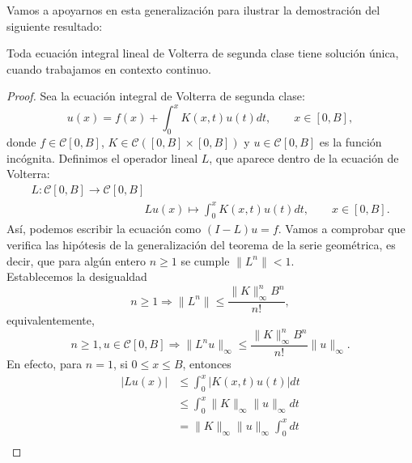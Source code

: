Vamos a apoyarnos en esta generalización para ilustrar la demostración del siguiente resultado:
\begin{corolario}\label{coroooolario}
	Toda ecuación integral lineal de Volterra de segunda clase tiene solución única, cuando trabajamos en contexto continuo.
\end{corolario}
\begin{proof}
	Sea la ecuación integral de Volterra de segunda clase:
	\begin{equation}
		u(x) = f(x) + \int_0^x K(x,t)u(t)dt, \qquad x \in [0,B],
	\end{equation}
	donde $f \in \mathcal{C}[0,B]$, $K \in \mathcal{C}([0,B]\times [0,B])$ y $u \in \mathcal{C}[0,B]$ es la función incógnita.
	Definimos el operador lineal $L$, que aparece dentro de la ecuación de Volterra:
	\begin{equation}\label{ref_operador}
		\begin{array}{c}
		L: \mathcal{C}[0,B] \rightarrow \mathcal{C}[0,B] \\
		\qquad \qquad \qquad \qquad \qquad Lu(x) \mapsto \displaystyle \int_{0}^{x} K(x,t)u(t)dt, \qquad x \in [0,B].
		\end{array}
	\end{equation}
	Así, podemos escribir la ecuación como $(I-L)u = f$.
	Vamos a comprobar que verifica las hipótesis de la generalización del teorema de la serie geométrica, es decir, que para algún entero $n \geqslant 1$ se cumple $\lVert L^n \rVert < 1$.\\
	Establecemos la desigualdad
	\begin{equation}
		n \geqslant 1 \Rightarrow \lVert L^n \rVert \leqslant \dfrac{\lVert K \rVert_\infty^nB^n}{n!},
	\end{equation}
	equivalentemente,
	\begin{equation}\label{eq:ref}
		n \geqslant 1, u \in \mathcal{C}[0,B] \Rightarrow \lVert L^nu \rVert_\infty \leqslant \dfrac{\lVert K \rVert_\infty^nB^n}{n!}\lVert u \rVert_\infty.
	\end{equation}
	En efecto, para $n = 1$, si $0 \leqslant x \leqslant B$, entonces
	\begin{equation}
		\begin{split}
			\lvert Lu(x) \rvert & \leqslant \int_{0}^{x} |K(x,t)u(t)|dt \\
			& \leqslant \int_{0}^{x} \lVert K \rVert_\infty \lVert u \rVert_\infty dt\\
			& = \lVert K \rVert_\infty \lVert u \rVert_\infty \int_{0}^{x}dt\\

\end{split}
\end{equation}
\end{proof}
